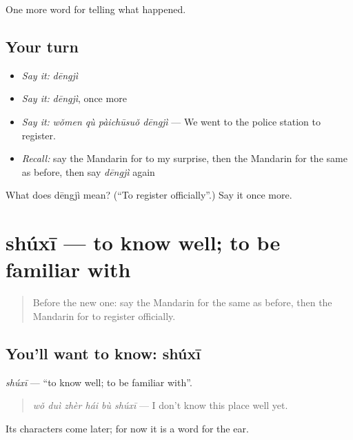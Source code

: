 \begin{grammarlens}[title={What you've built}]
One more word for telling what happened.
\end{grammarlens}

\subsection*{Your turn}
\begin{itemize}
\raggedright
  \item \emph{Say it:} \emph{dēngjì}
  \item \emph{Say it:} \emph{dēngjì}, once more
  \item \emph{Say it:} \emph{wǒmen qù pàichūsuǒ dēngjì} — We went to the police station to register.
  \item \emph{Recall:} say the Mandarin for to my surprise, then the Mandarin for the same as before, then say \emph{dēngjì} again
\end{itemize}

\begin{tcolorbox}[breakable,colback=teal!4,colframe=teal!35!black,title={Before you move on}]
What does dēngjì mean? (\textquotedblleft{}To register officially\textquotedblright{}.) Say it once more.
\end{tcolorbox}
\section[shúxī]{shúxī — to know well; to be familiar with}

\label{lesson:ZH-C316-shuxi}



\begin{quote}
Before the new one: say the Mandarin for the same as before, then the Mandarin for to register officially.
\end{quote}

\subsection*{You'll want to know: shúxī}
\emph{shúxī} — \textquotedblleft{}to know well; to be familiar with\textquotedblright{}.

\begin{quote}
\emph{wǒ duì zhèr hái bù shúxī} — I don't know this place well yet.
\end{quote}

Its characters come later; for now it is a word for the ear.

